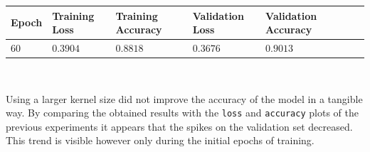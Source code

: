 \documentclass[11pt,a4paper]{article}
\begin{document}
\begin{center}
\hspace*{-0.8cm}
\begin{tabular}{|p{1.2cm}|p{1.8cm}|p{2cm}|p{2cm}|p{2cm}|p{2cm}|p{2cm}|}
\rowcolor{gray!50}
\hline
\textbf{Epoch} & \textbf{Training Loss} & \textbf{Training Accuracy} & \textbf{Validation Loss} & \textbf{Validation Accuracy}\\
\hline
$60$ & $0.3904$ & $0.8818$ & $0.3676$ & $0.9013$\\
\hline
\end{tabular}\\
\end{center}
Using a larger kernel size did not improve the accuracy of the model in a tangible way. By comparing the obtained results with the \texttt{loss} and \texttt{accuracy} plots of the previous experiments it appears that the spikes on the validation set decreased. This trend is visible however only during the initial epochs of training.
\end{document}
